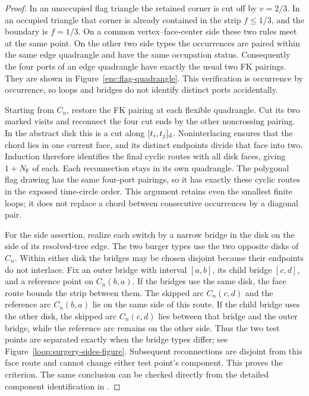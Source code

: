 \begin{proof}
In an unoccupied flag triangle the retained corner is cut off by
$v=2/3$.  In an occupied triangle that corner is already contained in the
strip $f\le1/3$, and the boundary is $f=1/3$.  On a common
vertex--face-center side these two rules meet at the same point.  On the
other two side types the occurrences are paired within the same edge
quadrangle and have the same occupation status.  Consequently the four
ports of an edge quadrangle have exactly the usual two FK pairings.
They are shown in Figure~\ref{enc:flag-quadrangle}.
This verification is occurrence by occurrence, so loops and bridges do
not identify distinct ports accidentally.

Starting from $C_n$, restore the FK pairing at each flexible quadrangle.
Cut its two marked visits and reconnect the four cut ends by the other
noncrossing pairing.  In the abstract disk this is a cut along
$[t_i,t_j]_{\rm d}$.  Noninterlacing ensures that the chord lies in one
current face, and its distinct endpoints divide that face into two.
Induction therefore identifies the final cyclic routes with all disk
faces, giving $1+N_{\mathsf F}$ of each.  Each reconnection stays in its
own quadrangle.  The polygonal flag drawing has the same four-port
pairings, so it has exactly these cyclic routes in the exposed
time-circle order.  This argument retains even the smallest finite
loops; it does not replace a chord between consecutive occurrences by
a diagonal pair.

For the side assertion, realize each switch by a narrow bridge in the
disk on the side of its resolved-tree edge.  The two burger types use
the two opposite disks of $C_n$.  Within either disk the bridges may
be chosen disjoint because their endpoints do not interlace.
Fix an outer bridge with interval $[a,b]$, its child bridge $[c,d]$,
and a reference point on $C_n(b,a)$.  If the bridges use the same disk,
the face route bounds the strip between them.  The skipped arc
$C_n(c,d)$ and the reference arc $C_n(b,a)$ lie on the same side of
this route.  If the child bridge uses the other disk, the skipped arc
$C_n(c,d)$ lies between that bridge and the outer bridge, while the
reference arc remains on the other side.  Thus the two test points
are separated exactly when the bridge types differ; see
Figure~\ref{loop:surgery-sides-figure}.  Subsequent reconnections are
disjoint from this face route and cannot change either test point's
component.  This proves the criterion.  The
same conclusion can be checked directly from the detailed component
identification in \cite[Lemmas~2.7 and~2.9]{GwynneMaoSunFKI}.
\end{proof}

